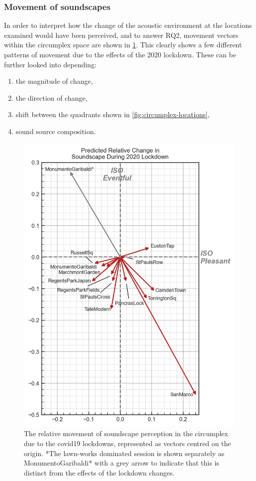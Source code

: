    \subsubsection{Movement of soundscapes}

   In order to interpret how the change of the acoustic environment at the locations examined would have been perceived, and to answer RQ2, movement vectors within the circumplex space are shown in \cref{fig:circumplex-vectors}. This clearly shows a few different patterns of movement due to the effects of the 2020 lockdown. These can be further looked into depending:

   \begin{enumerate}
     \item the magnitude of change,
     \item the direction of change,
     \item shift between the quadrants shown in \cref{fig:circumplex-locations},
     \item sound source composition.
   \end{enumerate}

   \begin{figure}
     \caption{The relative movement of soundscape perception in the circumplex due to the \gls{covid19} lockdowns, represented as vectors centred on the origin. *The lawn-works dominated session is shown separately as MonumentoGaribaldi* with a grey arrow to indicate that this is distinct from the effects of the lockdown changes. \label{fig:circumplex-vectors}}
    \centering
    \includegraphics[width=.75\textwidth]{Figures/Lockdown Figure6.jpg}
   \end{figure}

